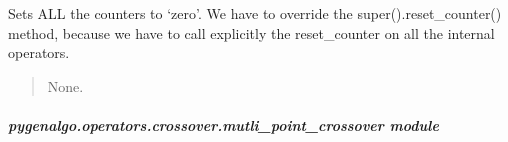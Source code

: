 \documentclass[letterpaper,10pt,english]{sphinxmanual}
\begin{document}
\begin{fulllineitems}
\begin{fulllineitems}
\label{\detokenize{pygenalgo.operators.crossover:pygenalgo.operators.crossover.meta_crossover.MetaCrossover.reset_counter}}
\pysigstartsignatures
{}
\pysigstopsignatures
\sphinxAtStartPar
Sets ALL the counters to ‘zero’. We have to override the super().reset\_counter()
method, because we have to call explicitly the reset\_counter on all the internal
operators.
\begin{quote}\begin{description}
\sphinxAtStartPar
None.

\end{description}\end{quote}

\end{fulllineitems}


\end{fulllineitems}



\subparagraph{pygenalgo.operators.crossover.mutli\_point\_crossover module}
\label{\detokenize{pygenalgo.operators.crossover:module-pygenalgo.operators.crossover.mutli_point_crossover}}\label{\detokenize{pygenalgo.operators.crossover:pygenalgo-operators-crossover-mutli-point-crossover-module}}
\end{document}
